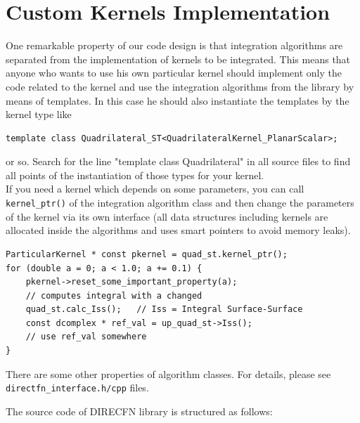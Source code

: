 \documentclass[a4wide,11pt]{article}
\renewcommand{\[}{\begin{equation}}
\renewcommand{\]}{\end{equation}}
\renewcommand{\{}{\begin{eqnarray}}
\renewcommand{\}}{\end{eqnarray}}
\begin{document}
\section{Custom Kernels Implementation}
One remarkable property of our code design is that
integration algorithms are separated from the implementation of kernels to be integrated.
This means that anyone who wants to use his own particular kernel should implement
only the code related to the kernel and use the integration algorithms from the library by means of templates.
In this case he should also instantiate the templates by the kernel type like
\begin{verbatim}
template class Quadrilateral_ST<QuadrilateralKernel_PlanarScalar>;
\end{verbatim}	
or so. Search for the line "template class Quadrilateral" in all source files to find
all points of the instantiation of those types for your kernel.\\

If you need a kernel which depends on some parameters, you can call 
\texttt{kernel\_ptr()} of the integration algorithm class and then change the parameters 
of the kernel via its own interface (all data structures including kernels are allocated inside
the algorithms and uses smart pointers to avoid memory leaks).
\begin{verbatim}
ParticularKernel * const pkernel = quad_st.kernel_ptr();
for (double a = 0; a < 1.0; a += 0.1) {
    pkernel->reset_some_important_property(a);
    // computes integral with a changed
    quad_st.calc_Iss();   // Iss = Integral Surface-Surface
    const dcomplex * ref_val = up_quad_st->Iss();
    // use ref_val somewhere
}

\end{verbatim}
There are some other properties of algorithm classes. For details, please see 
\texttt{directfn\_interface.h/cpp} files.

The source code of DIRECFN library is structured as follows:
\end{document}
